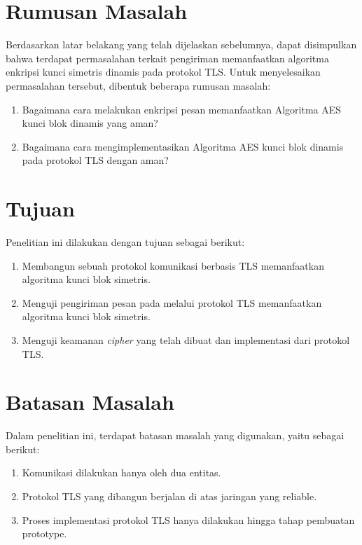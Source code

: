 \section{Rumusan Masalah}
Berdasarkan latar belakang yang telah dijelaskan sebelumnya, dapat disimpulkan bahwa terdapat permasalahan terkait pengiriman memanfaatkan algoritma enkripsi kunci simetris dinamis pada protokol TLS. Untuk menyelesaikan permasalahan tersebut, dibentuk beberapa rumusan masalah:
\begin{enumerate}
  \item Bagaimana cara melakukan enkripsi pesan memanfaatkan Algoritma AES kunci blok dinamis yang aman?
  \item Bagaimana cara mengimplementasikan Algoritma AES kunci blok dinamis pada protokol TLS dengan aman?
\end{enumerate}

\section{Tujuan}
Penelitian ini dilakukan dengan tujuan sebagai berikut:

\begin{enumerate}
  \item Membangun sebuah protokol komunikasi berbasis TLS memanfaatkan algoritma kunci blok simetris.
  \item Menguji pengiriman pesan pada melalui protokol TLS memanfaatkan algoritma kunci blok simetris.
  \item Menguji keamanan \emph{cipher} yang telah dibuat dan implementasi dari protokol TLS.
\end{enumerate}

\section{Batasan Masalah}
Dalam penelitian ini, terdapat batasan masalah yang digunakan, yaitu sebagai berikut:
\begin{enumerate}
  \item Komunikasi dilakukan hanya oleh dua entitas.
  \item Protokol TLS yang dibangun berjalan di atas jaringan yang reliable.
  \item Proses implementasi protokol TLS hanya dilakukan hingga tahap pembuatan prototype.
\end{enumerate}

